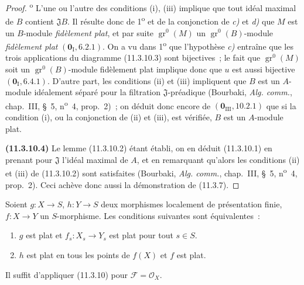\begin{proof}
\textsuperscript{o} L'une ou l'autre des conditions (i), (iii)
implique que tout idéal maximal de $B$ contient $\mathfrak JB$. Il résulte donc
de 1\textsuperscript{o} et de la conjonction de \emph{c)} et \emph{d)} que $M$ est un
$B$-module \emph{fidèlement plat}, et par suite $\operatorname{gr}^0(M)$ un
$\operatorname{gr}^0(B)$-module \emph{fidèlement plat}
$(\mathbf 0_{\mathrm I},6.2.1)$. On a vu dans 1\textsuperscript{o} que
l'hypothèse \emph{c)} entraîne que les trois applications du diagramme (11.3.10.3)
sont bijectives~; le fait que $\operatorname{gr}^0(M)$ soit un
$\operatorname{gr}^0(B)$-module fidèlement plat implique donc que $u$ est aussi
bijective $(\mathbf 0_{\mathrm I},6.4.1)$. D'autre part, les conditions (ii) et
(iii) impliquent que $B$ est un $A$-module idéalement séparé pour la filtration
$\mathfrak J$-préadique (Bourbaki, \emph{Alg. comm.}, chap.~III, \S~5,
n\textsuperscript{o}~4, prop.~2)~; on déduit donc encore de
$(\mathbf 0_{\mathrm{III}},10.2.1)$ que si la condition (i), ou la conjonction
de (ii) et (iii), est vérifiée, $B$ est un $A$-module plat.

\label{IV.11.3.10.4-fr}
\noindent\textbf{(11.3.10.4)} Le lemme (11.3.10.2) étant établi, on en déduit
(11.3.10.1) en prenant pour $\mathfrak J$ l'idéal maximal de $A$, et en
remarquant qu'alors les conditions (ii) et (iii) de (11.3.10.2) sont
satisfaites (Bourbaki, \emph{Alg. comm.}, chap.~III, \S~5, n\textsuperscript{o}~4,
prop.~2). Ceci achève donc aussi la démonstration de (11.3.7).
\end{proof}

\begin{corollary}[11.3.11]
\label{IV.11.3.11-fr}
Soient $g:X\to S$, $h:Y\to S$ deux morphismes localement de présentation
finie, $f:X\to Y$ un $S$-morphisme. Les conditions suivantes sont
équivalentes~:
\begin{enumerate}[label=\emph{\alph*)}]
\item $g$ est plat et $f_s:X_s\to Y_s$ est plat pour tout $s\in S$.
\item $h$ est plat en tous les points de $f(X)$ et $f$ est plat.
\end{enumerate}
\end{corollary}

Il suffit d'appliquer (11.3.10) pour $\mathcal F=\mathcal O_X$.

